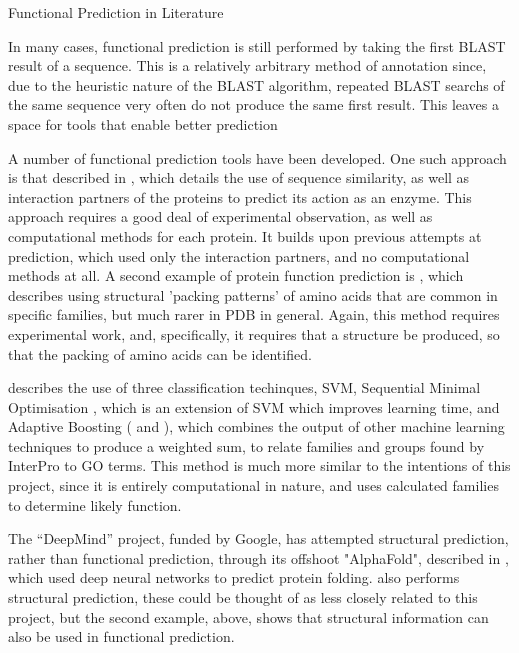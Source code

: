 \documentclass[12pt]{article}
\makeatletter
\renewcommand\subsection{\@startsection{subsection}{4}{\z@}
            {-2.5ex\@plus -1ex \@minus -.25ex}
            {1ex \@plus .25ex}
            {\normalfont\Large\bfseries}}
\makeatother
\begin{document}
		\subsection{Functional Prediction in Literature}
			
			In many cases, functional prediction is still performed by taking the first BLAST result of a sequence.  This is a relatively arbitrary method of annotation since, due to the heuristic nature of the BLAST algorithm, repeated BLAST searchs of the same sequence very often do not produce the same first result.  This leaves a space for tools that enable better prediction 
			
			A number of functional prediction tools have been developed.  One such approach is that described in \cite{RefWorks:doc:5d822c8ce4b07f40b9eae1b7}, which details the use of sequence similarity, as well as interaction partners of the proteins to predict its action as an enzyme.  This approach requires a good deal of experimental observation, as well as computational methods for each protein.  It builds upon previous attempts at prediction, which used only the interaction partners, and no computational methods at all.  A second example of protein function prediction is \cite{RefWorks:doc:5d822cfce4b0506e9759e8f8}, which describes using structural 'packing patterns' of amino acids that are common in specific families, but much rarer in PDB in general.  Again, this method requires experimental work, and, specifically, it requires that a structure be produced, so that the packing of amino acids can be identified. 
		
		\cite{RefWorks:doc:5d88a6d8e4b08db974488b16} describes the use of three classification techinques, SVM, Sequential Minimal Optimisation \citep{RefWorks:doc:5d88bafce4b0d12609fd641e}, which is an extension of SVM which improves learning time, and Adaptive Boosting (\cite{RefWorks:doc:5d88b8c6e4b0732b5fdb9dd5} and \cite{RefWorks:doc:5d88b89ce4b0d12609fd639c}), which combines the output of other machine learning techniques to produce a weighted sum, to relate families and groups found by InterPro \citep{RefWorks:doc:5d88a822e4b0d12609fd5fc4} to GO terms.  This method is much more similar to the intentions of this project, since it is entirely computational in nature, and uses calculated families to determine likely function.
		
			The ``DeepMind'' project, funded by Google, has attempted structural prediction, rather than functional prediction, through its offshoot "AlphaFold", described in \cite{RefWorks:doc:5d89ec21e4b02d8374a7bbe7}, which used deep neural networks to predict protein folding. \cite{RefWorks:doc:5d822dd5e4b07f40b9eae2f4} also performs structural prediction, these could be thought of as less closely related to this project, but the second example, above, shows that structural information can also be used in functional prediction.  
\end{document}
